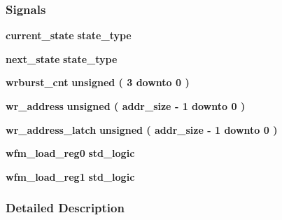 \subsubsection*{Signals}
 \begin{DoxyCompactItemize}
\item 
{\bf current\+\_\+state} {\bfseries {\bfseries {\bf state\+\_\+type}} \textcolor{vhdlchar}{ }} 
\item 
{\bf next\+\_\+state} {\bfseries {\bfseries {\bf state\+\_\+type}} \textcolor{vhdlchar}{ }} 
\item 
{\bf wrburst\+\_\+cnt} {\bfseries \textcolor{comment}{unsigned}\textcolor{vhdlchar}{ }\textcolor{vhdlchar}{(}\textcolor{vhdlchar}{ }\textcolor{vhdlchar}{ } \textcolor{vhdldigit}{3} \textcolor{vhdlchar}{ }\textcolor{keywordflow}{downto}\textcolor{vhdlchar}{ }\textcolor{vhdlchar}{ } \textcolor{vhdldigit}{0} \textcolor{vhdlchar}{ }\textcolor{vhdlchar}{)}\textcolor{vhdlchar}{ }} 
\item 
{\bf wr\+\_\+address} {\bfseries \textcolor{comment}{unsigned}\textcolor{vhdlchar}{ }\textcolor{vhdlchar}{(}\textcolor{vhdlchar}{ }\textcolor{vhdlchar}{ }\textcolor{vhdlchar}{ }\textcolor{vhdlchar}{ }{\bfseries {\bf addr\+\_\+size}} \textcolor{vhdlchar}{-\/}\textcolor{vhdlchar}{ } \textcolor{vhdldigit}{1} \textcolor{vhdlchar}{ }\textcolor{keywordflow}{downto}\textcolor{vhdlchar}{ }\textcolor{vhdlchar}{ } \textcolor{vhdldigit}{0} \textcolor{vhdlchar}{ }\textcolor{vhdlchar}{)}\textcolor{vhdlchar}{ }} 
\item 
{\bf wr\+\_\+address\+\_\+latch} {\bfseries \textcolor{comment}{unsigned}\textcolor{vhdlchar}{ }\textcolor{vhdlchar}{(}\textcolor{vhdlchar}{ }\textcolor{vhdlchar}{ }\textcolor{vhdlchar}{ }\textcolor{vhdlchar}{ }{\bfseries {\bf addr\+\_\+size}} \textcolor{vhdlchar}{-\/}\textcolor{vhdlchar}{ } \textcolor{vhdldigit}{1} \textcolor{vhdlchar}{ }\textcolor{keywordflow}{downto}\textcolor{vhdlchar}{ }\textcolor{vhdlchar}{ } \textcolor{vhdldigit}{0} \textcolor{vhdlchar}{ }\textcolor{vhdlchar}{)}\textcolor{vhdlchar}{ }} 
\item 
{\bf wfm\+\_\+load\+\_\+reg0} {\bfseries \textcolor{comment}{std\+\_\+logic}\textcolor{vhdlchar}{ }} 
\item 
{\bf wfm\+\_\+load\+\_\+reg1} {\bfseries \textcolor{comment}{std\+\_\+logic}\textcolor{vhdlchar}{ }} 
\end{DoxyCompactItemize}


\subsubsection{Detailed Description}


